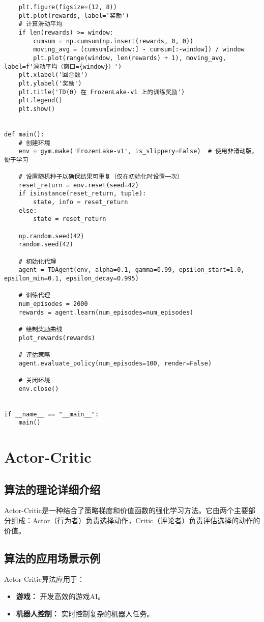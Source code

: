 \begin{lstlisting}
    plt.figure(figsize=(12, 8))
    plt.plot(rewards, label='奖励')
    # 计算滑动平均
    if len(rewards) >= window:
        cumsum = np.cumsum(np.insert(rewards, 0, 0))
        moving_avg = (cumsum[window:] - cumsum[:-window]) / window
        plt.plot(range(window, len(rewards) + 1), moving_avg, label=f'滑动平均（窗口={window}）')
    plt.xlabel('回合数')
    plt.ylabel('奖励')
    plt.title('TD(0) 在 FrozenLake-v1 上的训练奖励')
    plt.legend()
    plt.show()


def main():
    # 创建环境
    env = gym.make('FrozenLake-v1', is_slippery=False)  # 使用非滑动版，便于学习

    # 设置随机种子以确保结果可重复（仅在初始化时设置一次）
    reset_return = env.reset(seed=42)
    if isinstance(reset_return, tuple):
        state, info = reset_return
    else:
        state = reset_return

    np.random.seed(42)
    random.seed(42)

    # 初始化代理
    agent = TDAgent(env, alpha=0.1, gamma=0.99, epsilon_start=1.0, epsilon_min=0.1, epsilon_decay=0.995)

    # 训练代理
    num_episodes = 2000
    rewards = agent.learn(num_episodes=num_episodes)

    # 绘制奖励曲线
    plot_rewards(rewards)

    # 评估策略
    agent.evaluate_policy(num_episodes=100, render=False)

    # 关闭环境
    env.close()


if __name__ == "__main__":
    main()

\end{lstlisting}


\section{Actor-Critic}
\subsection*{算法的理论详细介绍}
Actor-Critic是一种结合了策略梯度和价值函数的强化学习方法。它由两个主要部分组成：Actor（行为者）负责选择动作，Critic（评论者）负责评估选择的动作的价值。

\subsection*{算法的应用场景示例}
Actor-Critic算法应用于：
\begin{itemize}
    \item \textbf{游戏：} 开发高效的游戏AI。
    \item \textbf{机器人控制：} 实时控制复杂的机器人任务。
\end{itemize}

